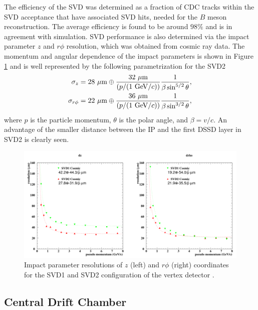 The efficiency of the SVD was determined as a fraction of CDC tracks within the SVD acceptance that have associated SVD hits, needed for the $B$ meson reconstruction. The average efficiency is found to be around $98\%$ and is in agreement with simulation. SVD performance is also determined via the impact parameter $z$ and $r\phi$ resolution, which was obtained from cosmic ray data. The momentum and angular dependence of the impact parameters is shown in Figure \ref{fig:SVD_performance} and is well represented by the following parametrization for the SVD2
\begin{align}
\sigma_z = 28\mathrm{~\mu m}\oplus \frac{32\mathrm{~\mu m}}{\left(p/(1\mathrm{~GeV}/c)\right)}\frac{1}{\beta \sin^{5/2}\theta},\\
\sigma_{r\phi} = 22\mathrm{~\mu m}\oplus \frac{36\mathrm{~\mu m}}{\left(p/(1\mathrm{~GeV}/c)\right)}\frac{1}{\beta \sin^{3/2}\theta},
\end{align}
where $p$ is the particle momentum, $\theta$ is the polar angle, and $\beta=v/c$. An advantage of the smaller distance between the IP and the first DSSD layer in SVD2 is clearly seen.

\begin{figure}[!htb]
	\centering
	\captionsetup{width=0.8\linewidth}
	\includegraphics[width=\linewidth]{fig/setup/SVD_performance_1}
	\caption{Impact parameter resolutions of $z$ (left) and $r\phi$ (right) coordinates for the SVD1 and SVD2 configuration of the vertex detector \cite{haba2004letter}.}
	\label{fig:SVD_performance}
\end{figure}


\subsection{Central Drift Chamber}

